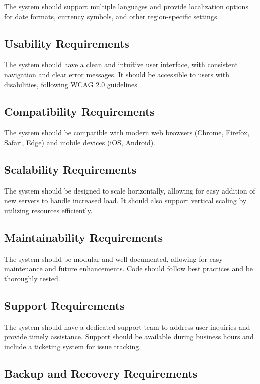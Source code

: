 The system should support multiple languages and provide localization options for date formats, currency symbols, and other region-specific settings.

\subsection{Usability Requirements}

The system should have a clean and intuitive user interface, with consistent navigation and clear error messages. It should be accessible to users with disabilities, following WCAG 2.0 guidelines.

\subsection{Compatibility Requirements}

The system should be compatible with modern web browsers (Chrome, Firefox, Safari, Edge) and mobile devices (iOS, Android).

\subsection{Scalability Requirements}

The system should be designed to scale horizontally, allowing for easy addition of new servers to handle increased load. It should also support vertical scaling by utilizing resources efficiently.

\subsection{Maintainability Requirements}

The system should be modular and well-documented, allowing for easy maintenance and future enhancements. Code should follow best practices and be thoroughly tested.

\subsection{Support Requirements}

The system should have a dedicated support team to address user inquiries and provide timely assistance. Support should be available during business hours and include a ticketing system for issue tracking.

\subsection{Backup and Recovery Requirements}

